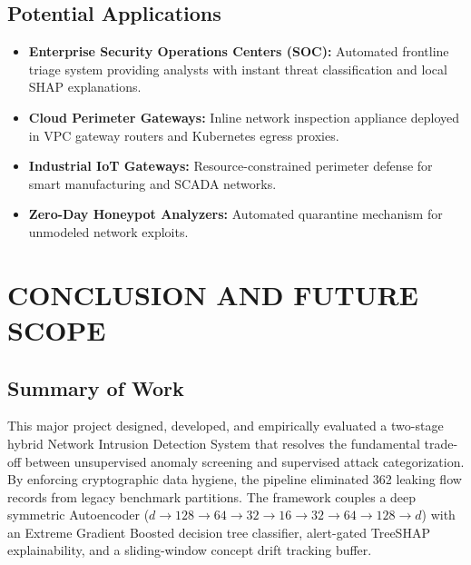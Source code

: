 \documentclass[12pt,a4paper]{report}
\begin{document}
\section{Potential Applications}
\begin{itemize}
    \item \textbf{Enterprise Security Operations Centers (SOC):} Automated frontline triage system providing analysts with instant threat classification and local SHAP explanations.
    \item \textbf{Cloud Perimeter Gateways:} Inline network inspection appliance deployed in VPC gateway routers and Kubernetes egress proxies.
    \item \textbf{Industrial IoT Gateways:} Resource-constrained perimeter defense for smart manufacturing and SCADA networks.
    \item \textbf{Zero-Day Honeypot Analyzers:} Automated quarantine mechanism for unmodeled network exploits.
\end{itemize}

\clearpage
\chapter{CONCLUSION AND FUTURE SCOPE}\label{ch:conclusion}

\section{Summary of Work}
This major project designed, developed, and empirically evaluated a two-stage hybrid Network Intrusion Detection System that resolves the fundamental trade-off between unsupervised anomaly screening and supervised attack categorization. By enforcing cryptographic data hygiene, the pipeline eliminated 362 leaking flow records from legacy benchmark partitions. The framework couples a deep symmetric Autoencoder ($d \to 128 \to 64 \to 32 \to 16 \to 32 \to 64 \to 128 \to d$) with an Extreme Gradient Boosted decision tree classifier, alert-gated TreeSHAP explainability, and a sliding-window concept drift tracking buffer.
\end{document}
